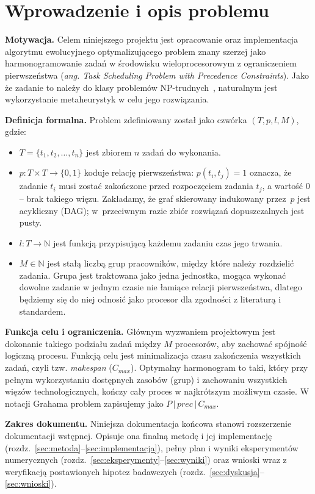 \documentclass[12pt,a4paper]{article}
\begin{document}
\section{Wprowadzenie i opis problemu}
\textbf{Motywacja.} Celem niniejszego projektu jest opracowanie oraz implementacja algorytmu ewolucyjnego optymalizującego problem znany szerzej jako harmonogramowanie zadań w środowisku wieloprocesorowym z ograniczeniem pierwszeństwa (\textit{ang. Task Scheduling Problem with Precedence Constraints}). Jako że zadanie to należy do klasy problemów NP-trudnych~\cite{ullman1975}, naturalnym jest wykorzystanie metaheurystyk w celu jego rozwiązania.
\par\medskip\noindent
\textbf{Definicja formalna.} Problem zdefiniowany został jako czwórka $(T, p, l, M)$, gdzie:
\begin{itemize}[itemsep=3pt, topsep=3pt]
    \item $T = \{t_1, t_2, \dots, t_n\}$ jest zbiorem $n$ zadań do wykonania.
    \item $p : T \times T \to \{0, 1\}$ koduje relację pierwszeństwa: $p(t_i, t_j) = 1$ oznacza, że zadanie $t_i$ musi zostać zakończone przed rozpoczęciem zadania $t_j$, a wartość $0$ -- brak takiego więzu. Zakładamy, że graf skierowany indukowany przez~$p$ jest acykliczny (DAG); w~przeciwnym razie zbiór rozwiązań dopuszczalnych jest pusty.
    \item $l: T \to \mathbb{N}$ jest funkcją przypisującą każdemu zadaniu czas jego trwania.
    \item $M \in \mathbb{N}$ jest stałą liczbą grup pracowników, między które należy rozdzielić zadania. Grupa jest traktowana jako jedna jednostka, mogąca wykonać dowolne zadanie w jednym czasie nie łamiące relacji pierwszeństwa, dlatego będziemy się do niej odnosić jako procesor dla zgodności z literaturą i standardem.
\end{itemize}
\noindent
\textbf{Funkcja celu i ograniczenia.} Głównym wyzwaniem projektowym jest dokonanie takiego podziału zadań między $M$ procesorów, aby zachować spójność logiczną procesu. Funkcją celu jest minimalizacja czasu zakończenia wszystkich zadań, czyli tzw. \textit{makespan} ($C_{max}$). Optymalny harmonogram to taki, który przy pełnym wykorzystaniu dostępnych zasobów (grup) i zachowaniu wszystkich więzów technologicznych, kończy cały proces w najkrótszym możliwym czasie. W notacji Grahama problem zapisujemy jako $P\,|\,prec\,|\,C_{max}$.
\par\medskip\noindent
\textbf{Zakres dokumentu.} Niniejsza dokumentacja końcowa stanowi rozszerzenie dokumentacji wstępnej. Opisuje ona finalną metodę i jej implementację (rozdz.~\ref{sec:metoda}--\ref{sec:implementacja}), pełny plan i wyniki eksperymentów numerycznych (rozdz.~\ref{sec:eksperymenty}--\ref{sec:wyniki}) oraz wnioski wraz z weryfikacją postawionych hipotez badawczych (rozdz.~\ref{sec:dyskusja}--\ref{sec:wnioski}).
\end{document}
